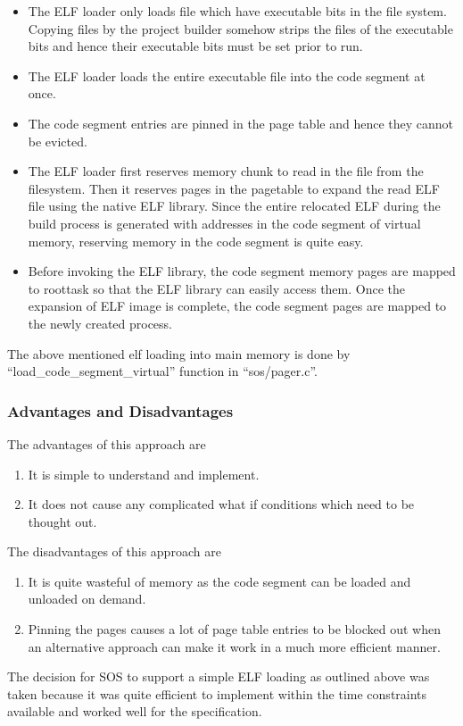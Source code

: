 \documentclass[a4paper, 11pt]{article}
\begin{document}
\begin{itemize}
\item The ELF loader only loads file which have executable bits in the
  file system. Copying files by the project builder somehow strips the
  files of the executable bits and hence their executable bits must be
  set prior to run.
\item The ELF loader loads the entire executable file into the code
  segment at once.
\item The code segment entries are pinned in the page table and hence
  they cannot be evicted.
\item The ELF loader first reserves memory chunk to read in the file
  from the filesystem. Then it reserves pages in the pagetable to
  expand the read ELF file using the native ELF library. Since the
  entire relocated ELF during the build process is generated with
  addresses in the code segment of virtual memory, reserving memory in
  the code segment is quite easy.
\item Before invoking the ELF library, the code segment memory pages
  are mapped to roottask so that the ELF library can easily access
  them. Once the expansion of ELF image is complete, the code segment
  pages are mapped to the newly created process.
\end{itemize}
The above mentioned elf loading into main memory is done by
``load\_code\_segment\_virtual'' function in ``sos/pager.c''.
\subsubsection{Advantages and Disadvantages}
The advantages of this approach are
\begin{enumerate}
\item It is simple to understand and implement. 
\item It does not cause any complicated what if conditions which need
  to be thought out.
\end{enumerate}
The disadvantages of this approach are
\begin{enumerate}
\item It is quite wasteful of memory as the code segment can be loaded
  and unloaded on demand.
\item Pinning the pages causes a lot of page table entries to be
  blocked out when an alternative approach can make it work in a much
  more efficient manner.
\end{enumerate}
The decision for SOS to support a simple ELF loading as outlined above
was taken because it was quite efficient to implement within the time
constraints available and worked well for the specification.
\end{document}
